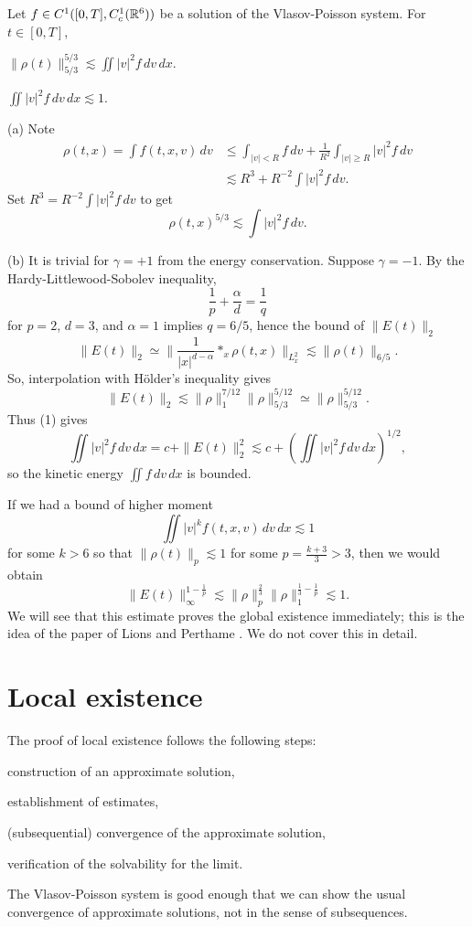 \documentclass{article}
\begin{document}
\begin{lem}
Let $f\in C^1([0,T],C_c^1(\mathbb{R}^6))$ be a solution of the Vlasov-Poisson system.
For $t\in[0,T]$,
\begin{parts}
\item $\|\rho(t)\|_{5/3}^{5/3}\lesssim\iint|v|^2f\,dv\,dx$.
\item $\iint|v|^2f\,dv\,dx\lesssim1$.
\end{parts}
\end{lem}
\begin{pf}
(a)
Note
\begin{align*}
\rho(t,x)=\int f(t,x,v)\,dv
&\le\int_{|v|<R}f\,dv+\frac1{R^2}\int_{|v|\ge R}|v|^2f\,dv\\
&\lesssim R^3+ R^{-2}\int|v|^2f\,dv.
\end{align*}
Set $R^3=R^{-2}\int|v|^2f\,dv$ to get
\[\rho(t,x)^{5/3}\lesssim\int|v|^2f\,dv.\]

(b)
It is trivial for $\gamma=+1$ from the energy conservation.
Suppose $\gamma=-1$.
By the Hardy-Littlewood-Sobolev inequality,
\[\frac1p+\frac\alpha d=\frac1q\]
for $p=2$, $d=3$, and $\alpha=1$ implies $q=6/5$, hence the bound of $\|E(t)\|_2$
\[\|E(t)\|_2\simeq\|\frac1{|x|^{d-\alpha}}*_x\rho(t,x)\|_{L_x^2}\lesssim\|\rho(t)\|_{6/5}.\]
So, interpolation with H\"older's inequality gives
\[\|E(t)\|_2\lesssim\|\rho\|_1^{7/12}\|\rho\|_{5/3}^{5/12}\simeq\|\rho\|_{5/3}^{5/12}.\]
Thus (1) gives
\[\iint|v|^2f\,dv\,dx=c+\|E(t)\|_2^2\lesssim c+(\iint|v|^2f\,dv\,dx)^{1/2},\]
so the kinetic energy $\iint f\,dv\,dx$ is bounded.\qedhere
\end{pf}

\begin{rmk}
If we had a bound of higher moment
\[\iint|v|^kf(t,x,v)\,dv\,dx\lesssim1\]
for some $k>6$ so that $\|\rho(t)\|_p\lesssim1$ for some $p=\frac{k+3}3>3$, then we would obtain
\[\|E(t)\|_\infty^{1-\frac1p}\lesssim\|\rho\|_p^{\frac23}\|\rho\|_1^{\frac13-\frac1p}\lesssim1.\]
We will see that this estimate proves the global existence immediately; this is the idea of the paper of Lions and Perthame \cite{lions1991propagation}.
We do not cover this in detail.
\end{rmk}




\section{Local existence}

The proof of local existence follows the following steps:
\begin{parts}
\item construction of an approximate solution,
\item establishment of estimates,
\item (subsequential) convergence of the approximate solution,
\item verification of the solvability for the limit.
\end{parts}
The Vlasov-Poisson system is good enough that we can show the usual convergence of approximate solutions, not in the sense of subsequences.
\end{document}
